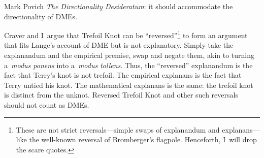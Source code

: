 \begin{artengenv}{Mark Povich}
\hangindent=0.6cm
\textit{The Directionality Desideratum}: it should accommodate the directionality of DMEs.
\parencite[][]{craver_directionality_2017}%


Craver and I~argue that Trefoil Knot can be ``reversed''\footnote{These are not strict reversals---simple swaps of explanandum and explanans---like the well-known reversal of Bromberger's flagpole. Henceforth, I~will drop the scare quotes. } to form an argument that fits Lange's
\parencite*[][]{lange_what_2013} %
 account of DME but is not explanatory. Simply take the explanandum and the empirical premise, swap and negate them, akin to turning a~\textit{modus ponens} into a~\textit{modus tollens}. Thus, the ``reversed'' explanandum is the fact that Terry's knot is not trefoil. The empirical explanans is the fact that Terry untied his knot. The mathematical explanans is the same: the trefoil knot is distinct from the unknot. Reversed Trefoil Knot and other such reversals should not count as DMEs.


\end{artengenv}
